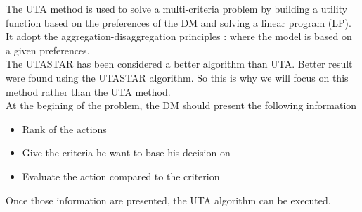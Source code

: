 \documentclass{report}
\begin{document}
The UTA method is used to solve a multi-criteria problem by building a utility function based on the preferences of the DM and solving a linear program (LP). It adopt the aggregation-disaggregation principles : where the model is based on a given preferences.\\

The UTASTAR has been considered a better algorithm than UTA. Better result were found using the UTASTAR algorithm. So this is why we will focus on this method rather than the UTA method.\\

At the begining of the problem, the DM should present the following information 
\begin{itemize}
\item Rank of the actions
\item Give the criteria he want to base his decision on 
\item Evaluate the action compared to the criterion
\end{itemize}
Once those information are presented, the UTA algorithm can be executed. 

\newpage
\end{document}
